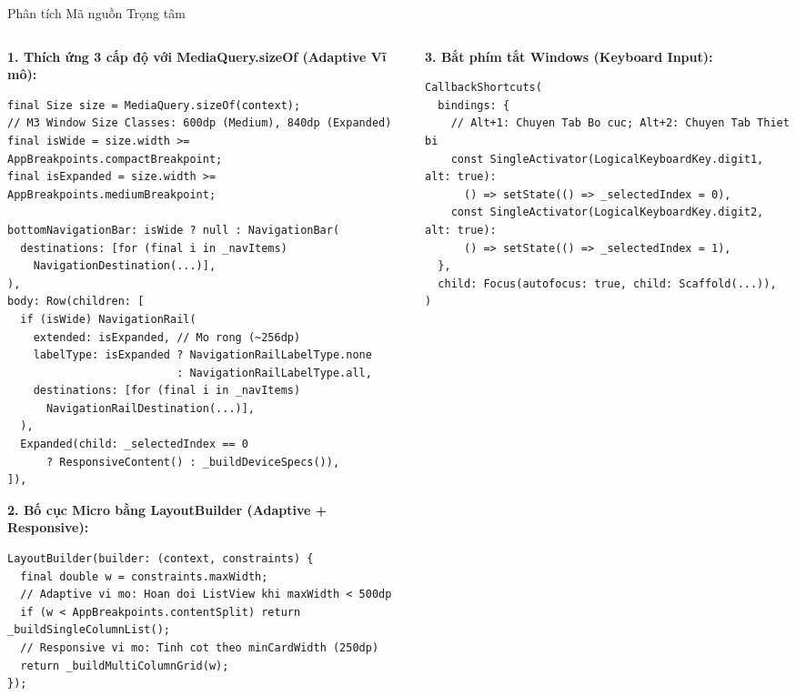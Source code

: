 \documentclass[aspectratio=169, 10pt]{beamer}
\begin{document}
\begin{frame}[fragile]{Phân tích Mã nguồn Trọng tâm}
  \vspace{-0.4cm}
  \begin{columns}[T]
    \begin{column}{0.49\textwidth}
      \textbf{\scriptsize 1. Thích ứng 3 cấp độ với MediaQuery.sizeOf (Adaptive Vĩ mô):}
\begin{lstlisting}
final Size size = MediaQuery.sizeOf(context);
// M3 Window Size Classes: 600dp (Medium), 840dp (Expanded)
final isWide = size.width >= AppBreakpoints.compactBreakpoint;
final isExpanded = size.width >= AppBreakpoints.mediumBreakpoint;

bottomNavigationBar: isWide ? null : NavigationBar(
  destinations: [for (final i in _navItems)
    NavigationDestination(...)],
),
body: Row(children: [
  if (isWide) NavigationRail(
    extended: isExpanded, // Mo rong (~256dp)
    labelType: isExpanded ? NavigationRailLabelType.none
                          : NavigationRailLabelType.all,
    destinations: [for (final i in _navItems)
      NavigationRailDestination(...)],
  ),
  Expanded(child: _selectedIndex == 0 
      ? ResponsiveContent() : _buildDeviceSpecs()),
]),
\end{lstlisting}

      \vskip 0.04cm
      \textbf{\scriptsize 2. Bố cục Micro bằng LayoutBuilder (Adaptive + Responsive):}
\begin{lstlisting}
LayoutBuilder(builder: (context, constraints) {
  final double w = constraints.maxWidth;
  // Adaptive vi mo: Hoan doi ListView khi maxWidth < 500dp
  if (w < AppBreakpoints.contentSplit) return _buildSingleColumnList();
  // Responsive vi mo: Tinh cot theo minCardWidth (250dp)
  return _buildMultiColumnGrid(w);
});
\end{lstlisting}
    \end{column}

    \begin{column}{0.49\textwidth}
      \textbf{\scriptsize 3. Bắt phím tắt Windows (Keyboard Input):}
\begin{lstlisting}
CallbackShortcuts(
  bindings: {
    // Alt+1: Chuyen Tab Bo cuc; Alt+2: Chuyen Tab Thiet bi
    const SingleActivator(LogicalKeyboardKey.digit1, alt: true): 
      () => setState(() => _selectedIndex = 0),
    const SingleActivator(LogicalKeyboardKey.digit2, alt: true): 
      () => setState(() => _selectedIndex = 1),
  },
  child: Focus(autofocus: true, child: Scaffold(...)),
)
\end{lstlisting}


\end{column}
\end{columns}
\end{frame}
\end{document}
